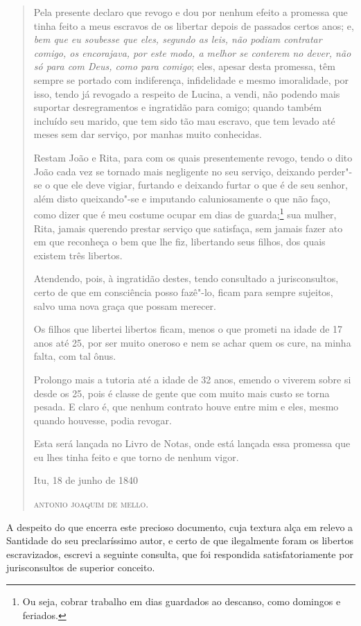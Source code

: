 \begin{quote}
Pela presente declaro que revogo e dou por nenhum efeito a promessa que
tinha feito a meus escravos de os libertar depois de passados certos
anos; e, \emph{bem que eu soubesse que eles, segundo as leis, não podiam
contratar comigo, os encorajava, por este modo, a melhor se conterem no
dever, não só para com Deus, como para comigo}; eles, apesar desta
promessa, têm sempre se portado com indiferença, infidelidade e mesmo
imoralidade, por isso, tendo já revogado a respeito de Lucina, a vendi,
não podendo mais suportar desregramentos e ingratidão para comigo;
quando também incluído seu marido, que tem sido tão mau escravo, que tem
levado até meses sem dar serviço, por manhas muito conhecidas.

Restam João e Rita, para com os quais presentemente revogo, tendo o dito
João cada vez se tornado mais negligente no seu serviço, deixando
perder"-se o que ele deve vigiar, furtando e deixando furtar o que é de
seu senhor, além disto queixando"-se e imputando caluniosamente o que não
faço, como dizer que é meu costume ocupar em dias de guarda;\footnote{
  Ou seja, cobrar trabalho em dias guardados ao descanso, como domingos
  e feriados.} sua mulher, Rita, jamais querendo prestar serviço que
satisfaça, sem jamais fazer ato em que reconheça o bem que lhe fiz,
libertando seus filhos, dos quais existem três libertos.

Atendendo, pois, à ingratidão destes, tendo consultado a jurisconsultos,
certo de que em consciência posso fazê"-lo, ficam para sempre sujeitos,
salvo uma nova graça que possam merecer.

Os filhos que libertei libertos ficam, menos o que prometi na idade de
17 anos até 25, por ser muito oneroso e nem se achar quem os cure, na
minha falta, com tal ônus.

Prolongo mais a tutoria até a idade de 32 anos, emendo o viverem sobre
si desde os 25, pois é classe de gente que com muito mais custo se torna
pesada. E claro é, que nenhum contrato houve entre mim e eles, mesmo
quando houvesse, podia revogar.

Esta será lançada no Livro de Notas, onde está lançada essa promessa que
eu lhes tinha feito e que torno de nenhum vigor.

\noindent{}Itu, 18 de junho de 1840\smallskip

\noindent{}\textsc{antonio joaquim de mello.}
\end{quote}

A despeito do que encerra este precioso documento, cuja textura alça em
relevo a Santidade do seu preclaríssimo autor, e certo de que
ilegalmente foram os libertos escravizados, escrevi a seguinte consulta,
que foi respondida satisfatoriamente por jurisconsultos de superior
conceito.


